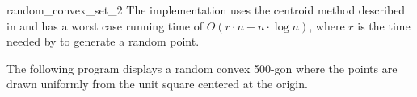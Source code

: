 \begin{ccRefFunction}{random_convex_set_2}
\ccImplementation 
The implementation uses the centroid method
described in \cite{cgal:s-zkm-96} and has a worst case running time of $O(r
\cdot n + n \cdot \log n)$, where $r$ is the time needed by 
to generate a random point.

\ccExample

The following program displays a random convex 500-gon where the
points are drawn uniformly from the unit square centered at the
origin.



\end{ccRefFunction}


